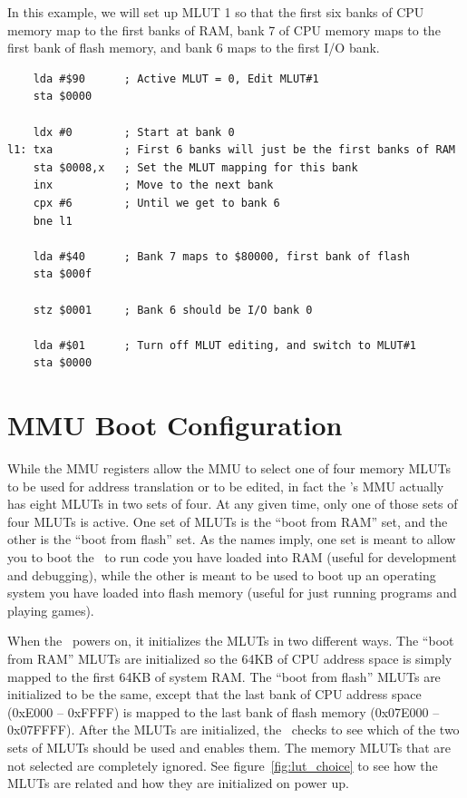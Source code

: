 In this example, we will set up MLUT 1 so that the first six banks of CPU memory map to the first banks of RAM, bank 7 of CPU memory maps to the first bank of flash memory, and bank 6 maps to the first I/O bank.

\begin{verbatim}
    lda #$90      ; Active MLUT = 0, Edit MLUT#1
    sta $0000

    ldx #0        ; Start at bank 0
l1: txa           ; First 6 banks will just be the first banks of RAM
    sta $0008,x   ; Set the MLUT mapping for this bank
    inx           ; Move to the next bank
    cpx #6        ; Until we get to bank 6
    bne l1

    lda #$40      ; Bank 7 maps to $80000, first bank of flash
    sta $000f

    stz $0001     ; Bank 6 should be I/O bank 0

    lda #$01      ; Turn off MLUT editing, and switch to MLUT#1
    sta $0000
\end{verbatim}

\section*{MMU Boot Configuration}
\label{pg:mmu_boot_config}

While the MMU registers allow the MMU to select one of four memory MLUTs to be used for address translation or to be edited, in fact the \jr's MMU actually has eight MLUTs in two sets of four. At any given time, only one of those sets of four MLUTs is active. One set of MLUTs is the ``boot from RAM'' set, and the other is the ``boot from flash'' set. As the names imply, one set is meant to allow you to boot the \jr\ to run code you have loaded into RAM (useful for development and debugging), while the other is meant to be used to boot up an operating system you have loaded into flash memory (useful for just running programs and playing games).

When the \jr\ powers on, it initializes the MLUTs in two different ways. The ``boot from RAM'' MLUTs are initialized so the 64KB of CPU address space is simply mapped to the first 64KB of system RAM. The ``boot from flash'' MLUTs are initialized to be the same, except that the last bank of CPU address space (0xE000 -- 0xFFFF) is mapped to the last bank of flash memory (0x07E000 -- 0x07FFFF). After the MLUTs are initialized, the \jr\ checks to see which of the two sets of MLUTs should be used and enables them. The memory MLUTs that are not selected are completely ignored. See figure~\ref{fig:lut_choice} to see how the MLUTs are related and how they are initialized on power up.

